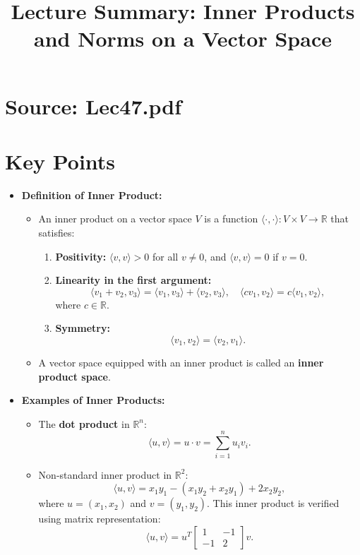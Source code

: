 \documentclass{article}
\title{Lecture Summary: Inner Products and Norms on a Vector Space}
\author{}
\date{}
\begin{document}
\maketitle

\section*{Source: Lec47.pdf}

\section*{Key Points}

\begin{itemize}
  \item \textbf{Definition of Inner Product:}
    \begin{itemize}
      \item An inner product on a vector space $V$ is a function $\langle \cdot, \cdot \rangle: V \times V \to \mathbb{R}$ that satisfies:
        \begin{enumerate}
          \item \textbf{Positivity:} $\langle v, v \rangle > 0$ for all $v \neq 0$, and $\langle v, v \rangle = 0$ if $v = 0$.
          \item \textbf{Linearity in the first argument:}
            \[
              \langle v_1 + v_2, v_3 \rangle = \langle v_1, v_3 \rangle + \langle v_2, v_3 \rangle, \quad \langle c v_1, v_2 \rangle = c \langle v_1, v_2 \rangle,
            \]
            where $c \in \mathbb{R}$.
          \item \textbf{Symmetry:}
            \[
              \langle v_1, v_2 \rangle = \langle v_2, v_1 \rangle.
            \]
        \end{enumerate}
      \item A vector space equipped with an inner product is called an \textbf{inner product space}.
    \end{itemize}

  \item \textbf{Examples of Inner Products:}
    \begin{itemize}
      \item The \textbf{dot product} in $\mathbb{R}^n$:
        \[
          \langle u, v \rangle = u \cdot v = \sum_{i=1}^n u_i v_i.
        \]
      \item Non-standard inner product in $\mathbb{R}^2$:
        \[
          \langle u, v \rangle = x_1 y_1 - (x_1 y_2 + x_2 y_1) + 2x_2 y_2,
        \]
        where $u = (x_1, x_2)$ and $v = (y_1, y_2)$. This inner product is verified using matrix representation:
        \[
          \langle u, v \rangle = u^T
          \begin{bmatrix}
            1 & -1 \\
            -1 & 2
          \end{bmatrix}
          v.
        \]
    \end{itemize}


\end{itemize}
\end{document}
